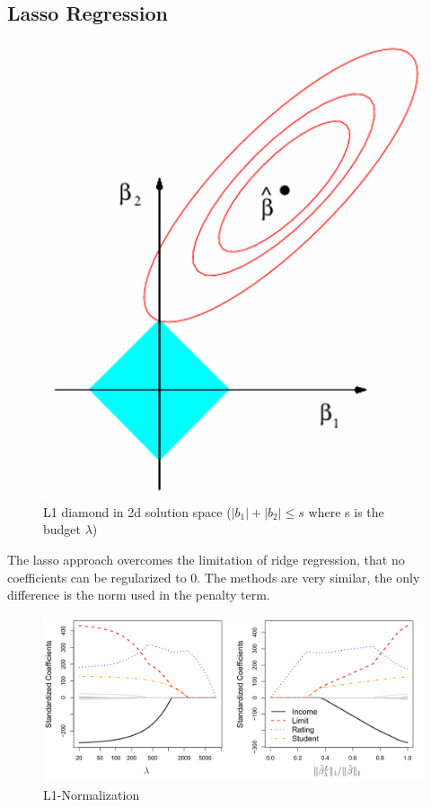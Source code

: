 \documentclass[../Main.tex]{subfiles}
\begin{document}
\subsection{Lasso Regression}
\begin{figure}[H]
    \centering
    \includegraphics[width=0.35\linewidth]{Images/l1-diamond.png}
    \caption{L1 diamond in 2d solution space (\(|b_1|+|b_2| \leq s\) where s is the budget \(\lambda\))}
\end{figure}


The lasso approach overcomes the limitation of ridge regression,
that no coefficients can be regularized to 0.
The methods are very similar, the only difference is the norm used in the penalty term.


\begin{figure}[H]
    \centering
    \includegraphics[width=1\linewidth]{Images/l1-norm.png}
    \caption{L1-Normalization}
\end{figure}
\end{document}
